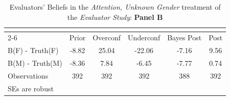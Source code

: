 \begin{table}[htbp]\centering
\caption{Evaluators' Beliefs in the \textit{Attention, Unknown Gender} treatment of the \textit{Evaluator Study}: \textbf{Panel B}}
\begin{tabular}{l*{5}{c}}
\hline\hline
                &\multicolumn{5}{c}{}                             \\\cmidrule(lr){2-6}
                &\multicolumn{1}{c}{Prior}&\multicolumn{1}{c}{Overconf}&\multicolumn{1}{c}{Underconf}&\multicolumn{1}{c}{Bayes Post}&\multicolumn{1}{c}{Post}\\
\hline
B(F) - Truth(F) &    -8.82&    25.04&   -22.06&    -7.16&     9.56\\
B(M) - Truth(M) &    -8.36&     7.84&    -6.45&    -7.77&     0.74\\
\hline
Observations    &      392&      392&      392&      388&      392\\
\hline\hline
\multicolumn{6}{l}{\footnotesize SEs are robust}\\
\end{tabular}
\end{table}
